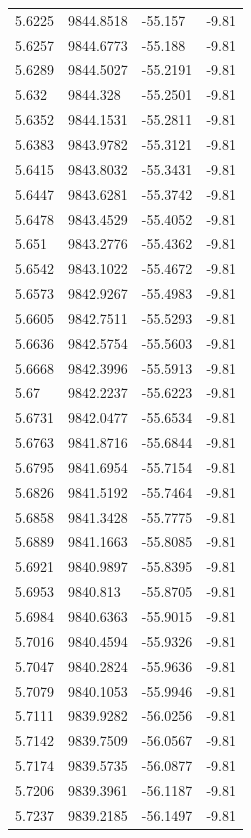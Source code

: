 \begin{table}[H]
\begin{tabular}{llll}
5.6225 & 9844.8518 & -55.157 & -9.81 \\
5.6257 & 9844.6773 & -55.188 & -9.81 \\
5.6289 & 9844.5027 & -55.2191 & -9.81 \\
5.632 & 9844.328 & -55.2501 & -9.81 \\
5.6352 & 9844.1531 & -55.2811 & -9.81 \\
5.6383 & 9843.9782 & -55.3121 & -9.81 \\
5.6415 & 9843.8032 & -55.3431 & -9.81 \\
5.6447 & 9843.6281 & -55.3742 & -9.81 \\
5.6478 & 9843.4529 & -55.4052 & -9.81 \\
5.651 & 9843.2776 & -55.4362 & -9.81 \\
5.6542 & 9843.1022 & -55.4672 & -9.81 \\
5.6573 & 9842.9267 & -55.4983 & -9.81 \\
5.6605 & 9842.7511 & -55.5293 & -9.81 \\
5.6636 & 9842.5754 & -55.5603 & -9.81 \\
5.6668 & 9842.3996 & -55.5913 & -9.81 \\
5.67 & 9842.2237 & -55.6223 & -9.81 \\
5.6731 & 9842.0477 & -55.6534 & -9.81 \\
5.6763 & 9841.8716 & -55.6844 & -9.81 \\
5.6795 & 9841.6954 & -55.7154 & -9.81 \\
5.6826 & 9841.5192 & -55.7464 & -9.81 \\
5.6858 & 9841.3428 & -55.7775 & -9.81 \\
5.6889 & 9841.1663 & -55.8085 & -9.81 \\
5.6921 & 9840.9897 & -55.8395 & -9.81 \\
5.6953 & 9840.813 & -55.8705 & -9.81 \\
5.6984 & 9840.6363 & -55.9015 & -9.81 \\
5.7016 & 9840.4594 & -55.9326 & -9.81 \\
5.7047 & 9840.2824 & -55.9636 & -9.81 \\
5.7079 & 9840.1053 & -55.9946 & -9.81 \\
5.7111 & 9839.9282 & -56.0256 & -9.81 \\
5.7142 & 9839.7509 & -56.0567 & -9.81 \\
5.7174 & 9839.5735 & -56.0877 & -9.81 \\
5.7206 & 9839.3961 & -56.1187 & -9.81 \\
5.7237 & 9839.2185 & -56.1497 & -9.81 \\

\end{tabular}
\end{table}
